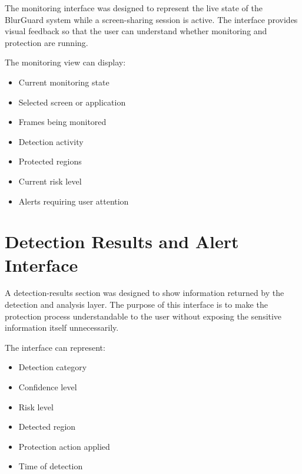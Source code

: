 \documentclass[12pt,a4paper]{article}
\begin{document}
The monitoring interface was designed to represent the live state of the BlurGuard
system while a screen-sharing session is active. The interface provides visual feedback
so that the user can understand whether monitoring and protection are running.

The monitoring view can display:

\begin{itemize}

    \item Current monitoring state

    \item Selected screen or application

    \item Frames being monitored

    \item Detection activity

    \item Protected regions

    \item Current risk level

    \item Alerts requiring user attention

\end{itemize}


\section{Detection Results and Alert Interface}

A detection-results section was designed to show information returned by the detection
and analysis layer. The purpose of this interface is to make the protection process
understandable to the user without exposing the sensitive information itself unnecessarily.

The interface can represent:

\begin{itemize}

    \item Detection category

    \item Confidence level

    \item Risk level

    \item Detected region

    \item Protection action applied

    \item Time of detection

\end{itemize}
\end{document}
